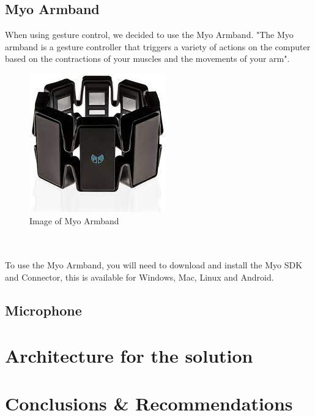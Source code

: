 \documentclass{article}
\begin{document}
\subsection{Myo Armband}

When using gesture control, we decided to use the Myo Armband. "The Myo armband is a gesture controller that triggers a variety of actions on the computer based on the contractions of your muscles and the movements of your arm".
\begin{figure}[h]
    \includegraphics[scale=0.6]{img/myoarmband2.jpg}
    \centering
    \caption{Image of Myo Armband}
    \label{fig: A Picture of the Myo Armband}
\end{figure}
\\ \\
To use the Myo Armband, you will need to download and install the Myo SDK and Connector, this is available for Windows, Mac, Linux and Android.

\subsection{Microphone}

\section{Architecture for the solution}

\section{Conclusions \& Recommendations}
\end{document}
